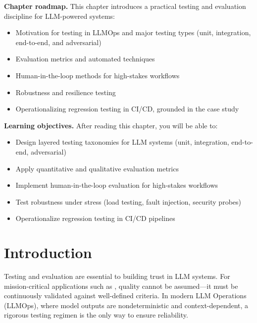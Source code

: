 \begin{tcolorbox}[
  title={\textbf{Chapter Overview}},
  colback=blue!5,
  colframe=blue!40!black,
  colbacktitle=blue!20,
  coltitle=black,
  fonttitle=\bfseries,
  boxrule=0.7pt,
  arc=4pt,
  left=5mm, right=5mm, top=4mm, bottom=4mm
]
\noindent\textbf{Chapter roadmap.}
This chapter introduces a practical testing and evaluation discipline for LLM-powered systems:
\begin{itemize}[leftmargin=1.5em, itemsep=3pt]
    \item Motivation for testing in LLMOps and major testing types (unit, integration, end-to-end, and adversarial)
    \item Evaluation metrics and automated techniques
    \item Human-in-the-loop methods for high-stakes workflows
    \item Robustness and resilience testing
    \item Operationalizing regression testing in CI/CD, grounded in the \ishtar{} case study
\end{itemize}

\medskip
\noindent\textbf{Learning objectives.} After reading this chapter, you will be able to:
\begin{itemize}[leftmargin=1.5em, itemsep=3pt]
    \item Design layered testing taxonomies for LLM systems (unit, integration, end-to-end, adversarial)
    \item Apply quantitative and qualitative evaluation metrics
    \item Implement human-in-the-loop evaluation for high-stakes workflows
    \item Test robustness under stress (load testing, fault injection, security probes)
    \item Operationalize regression testing in CI/CD pipelines
\end{itemize}
\end{tcolorbox}


\section{Introduction}
\label{sec:ch10-introduction}
Testing and evaluation are essential to building trust in LLM systems. For mission-critical applications such as \ishtar{}, quality cannot be assumed—it must be continuously validated against well-defined criteria. In modern LLM Operations (LLMOps), where model outputs are nondeterministic and context-dependent, a rigorous testing regimen is the only way to ensure reliability.  

